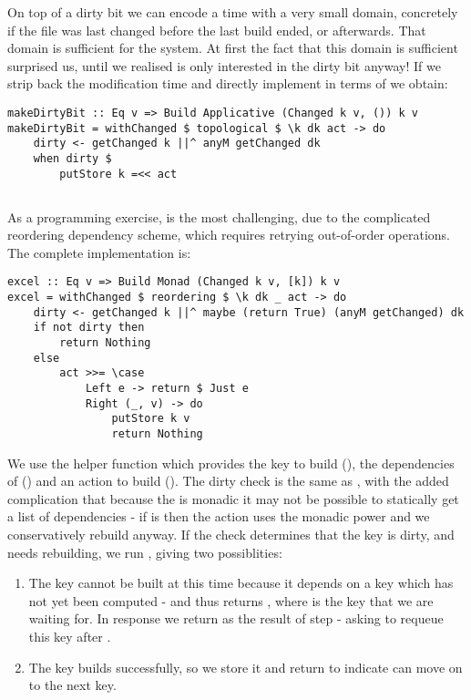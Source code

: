 On top of a dirty bit we can encode a time with a very small domain, concretely if the file was last changed before the last build ended, or afterwards. That domain is sufficient for the \Make system. At first the fact that this domain is sufficient surprised us, until we realised \Make is only interested in the dirty bit anyway! If we strip back the modification time and directly implement \Make in terms of  we obtain:

\begin{verbatim}
makeDirtyBit :: Eq v => Build Applicative (Changed k v, ()) k v
makeDirtyBit = withChanged $ topological $ \k dk act -> do
    dirty <- getChanged k ||^ anyM getChanged dk
    when dirty $
        putStore k =<< act
\end{verbatim}

\subsection{\Excel}\label{sec-implementation-excel}

As a programming exercise, \Excel is the most challenging, due to the complicated reordering dependency scheme, which requires retrying out-of-order operations. The complete implementation is:

\begin{verbatim}
excel :: Eq v => Build Monad (Changed k v, [k]) k v
excel = withChanged $ reordering $ \k dk _ act -> do
    dirty <- getChanged k ||^ maybe (return True) (anyM getChanged) dk
    if not dirty then
        return Nothing
    else
        act >>= \case
            Left e -> return $ Just e
            Right (_, v) -> do
                putStore k v
                return Nothing
\end{verbatim}

We use the helper function  which provides the key to build (), the dependencies of  () and an action to build  (). The dirty check is the same as , with the added complication that because the  is monadic it may not be possible to statically get a list of dependencies - if  is  then the action uses the monadic power and we conservatively rebuild anyway. If the check determines that the key is dirty, and needs rebuilding, we run , giving two possiblities:

\begin{enumerate}
\item The key cannot be built at this time because it depends on a key which has not yet been computed - and thus  returns , where  is the key that we are waiting for. In response we return  as the result of step - asking  to requeue this key after .
\item The key builds successfully, so we store it and return  to indicate  can move on to the next key.
\end{enumerate}

